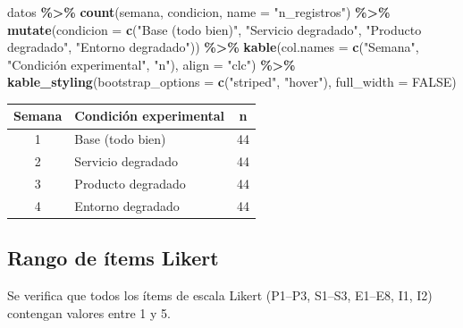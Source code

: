 \documentclass[
  spanish,
]{article}
\newenvironment{Shaded}{\begin{snugshade}}{\end{snugshade}}
\newcommand{\AttributeTok}[1]{\textcolor[rgb]{0.13,0.29,0.53}{#1}}
\newcommand{\ConstantTok}[1]{\textcolor[rgb]{0.56,0.35,0.01}{#1}}
\newcommand{\FunctionTok}[1]{\textcolor[rgb]{0.13,0.29,0.53}{\textbf{#1}}}
\newcommand{\NormalTok}[1]{#1}
\newcommand{\SpecialCharTok}[1]{\textcolor[rgb]{0.81,0.36,0.00}{\textbf{#1}}}
\newcommand{\StringTok}[1]{\textcolor[rgb]{0.31,0.60,0.02}{#1}}
\begin{document}
\begin{Shaded}
\begin{Highlighting}[]
\NormalTok{datos }\SpecialCharTok{\%\textgreater{}\%}
  \FunctionTok{count}\NormalTok{(semana, condicion, }\AttributeTok{name =} \StringTok{"n\_registros"}\NormalTok{) }\SpecialCharTok{\%\textgreater{}\%}
  \FunctionTok{mutate}\NormalTok{(}\AttributeTok{condicion =} \FunctionTok{c}\NormalTok{(}\StringTok{"Base (todo bien)"}\NormalTok{,}
                        \StringTok{"Servicio degradado"}\NormalTok{,}
                        \StringTok{"Producto degradado"}\NormalTok{,}
                        \StringTok{"Entorno degradado"}\NormalTok{)) }\SpecialCharTok{\%\textgreater{}\%}
  \FunctionTok{kable}\NormalTok{(}\AttributeTok{col.names =} \FunctionTok{c}\NormalTok{(}\StringTok{"Semana"}\NormalTok{, }\StringTok{"Condición experimental"}\NormalTok{, }\StringTok{"n"}\NormalTok{),}
        \AttributeTok{align =} \StringTok{"clc"}\NormalTok{) }\SpecialCharTok{\%\textgreater{}\%}
  \FunctionTok{kable\_styling}\NormalTok{(}\AttributeTok{bootstrap\_options =} \FunctionTok{c}\NormalTok{(}\StringTok{"striped"}\NormalTok{, }\StringTok{"hover"}\NormalTok{),}
                \AttributeTok{full\_width =} \ConstantTok{FALSE}\NormalTok{)}
\end{Highlighting}
\end{Shaded}

\begin{longtable}[t]{clc}
\toprule
Semana & Condición experimental & n\\
\midrule
1 & Base (todo bien) & 44\\
2 & Servicio degradado & 44\\
3 & Producto degradado & 44\\
4 & Entorno degradado & 44\\
\bottomrule
\end{longtable}

\subsection{Rango de ítems Likert}\label{rango-de-uxedtems-likert}

Se verifica que todos los ítems de escala Likert (P1--P3, S1--S3,
E1--E8, I1, I2) contengan valores entre 1 y 5.
\end{document}
